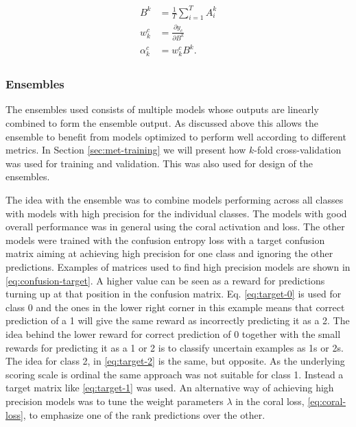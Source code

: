  \begin{align}
   \begin{split}
      B^k &= \frac{1}{T}\sum_{i=1}^T A_i^k \\
      w_k^c &= \frac{\partial y_c}{\partial B^k} \\
      \alpha_k^c &= w_k^c B^k.
      \label{eq:input-importance}
   \end{split}
 \end{align}


\subsubsection{Ensembles} \label{sec:met-ensembles}
The ensembles used consists of multiple models whose outputs are linearly combined to form the ensemble output. As discussed above this allows the ensemble to benefit from models optimized to perform well according to different metrics. In Section \ref{sec:met-training} we will present how $k$-fold cross-validation was used for training and validation. This was also used for design of the ensembles.

The idea with the ensemble was to combine models performing across all classes with models with high precision for the individual classes. The models with good overall performance was in general using the \gls{coral} activation and loss. The other models were trained with the confusion entropy loss with a target confusion matrix aiming at achieving high precision for one class and ignoring the other predictions. Examples of matrices used to find high precision models are shown in \eqref{eq:confusion-target}. A higher value can be seen as a reward for predictions turning up at that position in the confusion matrix. Eq. \eqref{eq:target-0} is used for class 0 and the ones in the lower right corner in this example means that correct prediction of a 1 will give the same reward as incorrectly predicting it as a 2.
The idea behind the lower reward for correct prediction of 0 together with the small rewards for predicting it as a 1 or 2 is to classify uncertain examples as 1s or 2s. The idea for class 2, in \eqref{eq:target-2} is the same, but opposite. As the underlying scoring scale is ordinal the same approach was not suitable for class 1. Instead a target matrix like \eqref{eq:target-1} was used. An alternative way of achieving high precision models was to tune the weight parameters $\lambda$ in the \gls{coral} loss, \eqref{eq:coral-loss}, to emphasize one of the rank predictions over the other.

